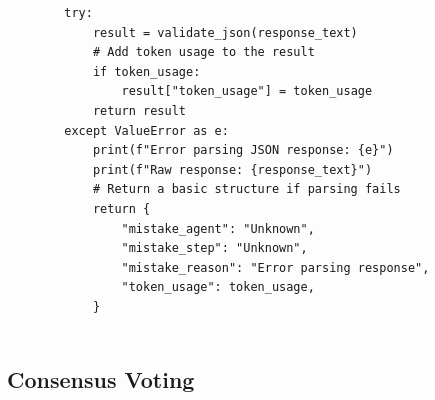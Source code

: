 \documentclass{article}
\begin{document}
\begin{lstlisting}
        try:
            result = validate_json(response_text)
            # Add token usage to the result
            if token_usage:
                result["token_usage"] = token_usage
            return result
        except ValueError as e:
            print(f"Error parsing JSON response: {e}")
            print(f"Raw response: {response_text}")
            # Return a basic structure if parsing fails
            return {
                "mistake_agent": "Unknown",
                "mistake_step": "Unknown",
                "mistake_reason": "Error parsing response",
                "token_usage": token_usage,
            }
                   
\end{lstlisting}


\subsection{Consensus Voting}\label{appendix:consensus_voting}
\end{document}
